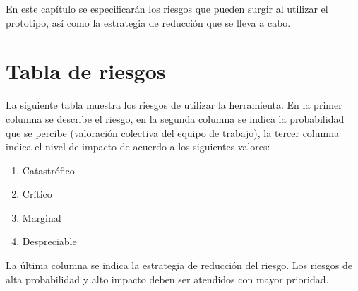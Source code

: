 En este capítulo se especificarán los riesgos que pueden surgir al utilizar el prototipo, así como la estrategia de reducción que se lleva a cabo. 



\section{Tabla de riesgos}
La siguiente tabla muestra los riesgos de utilizar la herramienta.
En la primer columna se describe el riesgo, en la segunda columna se indica la 
probabilidad que se percibe (valoración colectiva del equipo de trabajo), la tercer columna indica el nivel de impacto de acuerdo a los siguientes valores:

\begin{enumerate}
 \item Catastrófico
 \item Crítico
 \item Marginal 
 \item Despreciable
\end{enumerate}

La última columna se indica la estrategia de reducción del riesgo. Los riesgos de alta probabilidad y alto impacto deben ser atendidos con mayor prioridad.\\


